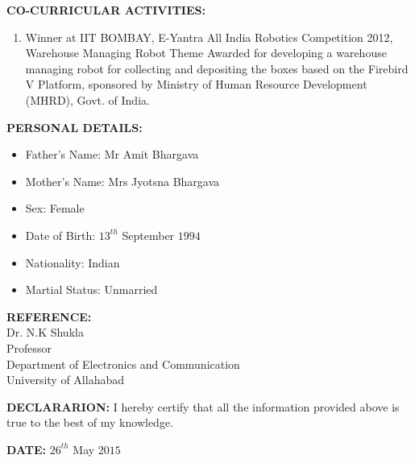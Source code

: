\documentclass{article}
\begin{document}
\textbf{CO-CURRICULAR ACTIVITIES:}
\begin{enumerate}
	\item Winner at IIT BOMBAY, E-Yantra All India Robotics Competition 2012, Warehouse Managing Robot Theme
	Awarded for developing a warehouse managing robot for collecting and depositing the boxes based on the Firebird V Platform, sponsored by Ministry of Human Resource Development (MHRD), Govt. of India.
\end{enumerate}

\textbf{PERSONAL DETAILS:}
\begin{itemize}
	\item Father's Name: Mr Amit Bhargava
	\item Mother's Name: Mrs Jyotsna Bhargava
	\item Sex: Female
	\item Date of Birth: $13^{th}$ September $1994$
	\item Nationality: Indian
	\item Martial Status: Unmarried
\end{itemize}

\textbf{REFERENCE:}\\
Dr. N.K Shukla\\
Professor\\
Department of Electronics and Communication\\
University of Allahabad
\newline

\textbf{DECLARARION:}
I hereby certify that all the information provided above is true to the best of my knowledge.
\newline

\textbf{DATE:}
$26^{th}$ May $2015$
\end{document}
